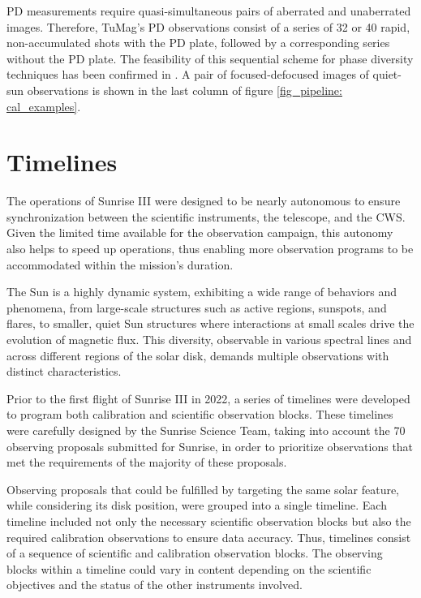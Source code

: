 PD measurements require quasi-simultaneous pairs of aberrated and unaberrated images. Therefore, TuMag's PD observations consist of a series of 32 or 40 rapid, non-accumulated shots with the PD plate, followed by a corresponding series without the PD plate. The feasibility of this sequential scheme for phase diversity techniques has been confirmed in \cite{PD_sequential}. A pair of focused-defocused images of quiet-sun observations is shown in the last column of figure \ref{fig_pipeline: cal_examples}.

\section{Timelines}

The operations of Sunrise III were designed to be nearly autonomous to ensure synchronization between the scientific instruments, the telescope, and the CWS. Given the limited time available for the observation campaign, this autonomy also helps to speed up operations, thus enabling more observation programs to be accommodated within the mission's duration.

The Sun is a highly dynamic system, exhibiting a wide range of behaviors and phenomena, from large-scale structures such as active regions, sunspots, and flares, to smaller, quiet Sun structures where interactions at small scales drive the evolution of magnetic flux. This diversity, observable in various spectral lines and across different regions of the solar disk, demands multiple observations with distinct characteristics.

Prior to the first flight of Sunrise III in 2022, a series of timelines were developed to program both calibration and scientific observation blocks. These timelines were carefully designed by the Sunrise Science Team, taking into account the 70 observing proposals submitted for Sunrise, in order to prioritize observations that met the requirements of the majority of these proposals.

Observing proposals that could be fulfilled by targeting the same solar feature, while considering its disk position, were grouped into a single timeline. Each timeline included not only the necessary scientific observation blocks but also the required calibration observations to ensure data accuracy. Thus, timelines consist of a sequence of scientific and calibration observation blocks. The observing blocks within a timeline could vary in content depending on the scientific objectives and the status of the other instruments involved.

